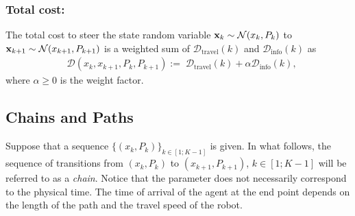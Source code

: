 \documentclass[Afour,sageh,times]{sagej}
\newcommand{\bx}{{\bf x}}
\begin{document}


\subsubsection{Total cost:}
The total cost to steer the state random variable $\bx_k\sim\mathcal{N}(x_k, P_k)$ to $\bx_{k+1}\sim\mathcal{N}(x_{k+1}, P_{k+1})$ is a weighted sum of $\mathcal{D}_{\text{travel}}(k)$ and $\mathcal{D}_{\text{info}}(k)$ as
\begin{align}
\label{eq:def_D}
&\mathcal{D}(x_k, x_{k+1}, P_k, P_{k+1}):= \; \mathcal{D}_{\text{travel}}(k)+\alpha \mathcal{D}_{\text{info}}(k),
\end{align}
where $\alpha\geq 0$ is the weight factor.
\subsection{Chains and Paths}
Suppose that a sequence $\{(x_k, P_k)\}_{k\in[1;K-1]}$ is given. In what follows, the sequence of transitions from $(x_k, P_k)$ to $(x_{k+1}, P_{k+1})$, ${k\in[1;K-1]}$ will be referred to as a \emph{chain}. 
Notice that the parameter  does not necessarily correspond to the physical time. The time of arrival of the agent at the end point depends on the length of the path and the travel speed of the robot. 
\end{document}
